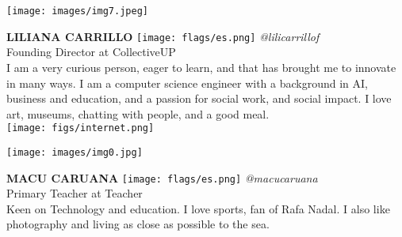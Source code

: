 \noindent
\begin{minipage}{0.3\textwidth}
\centering
\texttt{[image: images/img7.jpeg]}
\end{minipage}
\hfill
\begin{minipage}{0.6\textwidth}\raggedright
\color{color1}\uppercase{\textbf{Liliana Carrillo}}
\color{color2}\hspace{0.2cm}\texttt{[image: flags/es.png]}
\hspace{0.2cm}\textit{@lilicarrillof}
\\
Founding Director at CollectiveUP\\
{\footnotesize I am a very curious person, eager to learn, and that has brought me to innovate in many ways.  I am a computer science engineer with a background in AI, business and education, and a passion for social work, and social impact.  I love art, museums, chatting with people, and a good meal.}\\
\texttt{[image: figs/internet.png]}
\end{minipage}
\newline\newline\newline

\noindent
\begin{minipage}{0.3\textwidth}
\centering
\texttt{[image: images/img0.jpg]}
\end{minipage}
\hfill
\begin{minipage}{0.6\textwidth}\raggedright
\color{color1}\uppercase{\textbf{Macu Caruana}}
\color{color2}\hspace{0.2cm}\texttt{[image: flags/es.png]}
\hspace{0.2cm}\textit{@macucaruana}
\\
Primary Teacher at Teacher\\
{\footnotesize Keen on Technology and education. I love sports, fan of Rafa Nadal. I also like photography and living as close as possible to the sea.}\\
\end{minipage}
\newline\newline\newline

